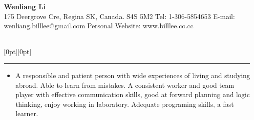 \documentclass[a4paper,12pt]{letter}
\begin{document}
\newcommand{\secb}{ ~\\[-15mm]}

\newcommand{\parab}{ ~\\[-8mm]}


%
% 

\begin{center}
\textbf{\Huge Wenliang Li} \\[3mm]
\textrm{\normalsize 175 Deergrove Cre, Regina} \linebreak
\textrm{\normalsize SK, Canada. S4S 5M2} \linebreak
\textrm{\normalsize Tel: 1-306-5854653} \linebreak
\textrm{\normalsize E-mail: wenliang.billlee@gmail.com} \linebreak
\textrm{\normalsize Personal Website: www.billlee.co.cc}
\end{center}

~\\[-20mm]


\raisebox{0pt}[0pt][0pt]{\Large\textbf{\raisebox{-3.5ex}{Profile}}}
\\[2mm]
\rule[-0.5cm]{10cm}{1pt}
\begin{itemize}
\item \textrm{\normalsize A responsible and patient person with wide experiences of living and studying abroad. Able to learn from mistakes. A consistent worker and good team player with effective communication skills, good at forward planning and logic thinking, enjoy working in laboratory. Adequate programing skills, a fast learner.}
\end{itemize} 
\end{document}
